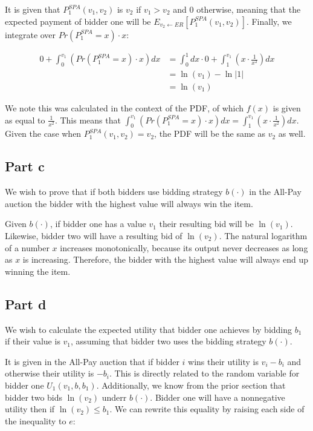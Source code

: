 \documentclass[12pt]{article}%
\begin{document}
It is given that $P_{1}^{SPA}(v_1, v_2)$ is $v_2$ if $v_1 > v_2$ and 0 otherwise, meaning that the expected payment of bidder one will be $E_{v_2 \leftarrow ER} [P_{1}^{SPA}(v_1, v_2)]$. Finally, we integrate over $Pr(P_{1}^{SPA} = x) \cdot x$:

\begin{equation}
\begin{split}
0 + \int_{0}^{v_1} (Pr(P_{1}^{SPA} = x) \cdot x)dx &= \int_{0}^{1} dx \cdot 0 + \int_{1}^{v_1} (x \cdot \frac{1}{x^2})dx\\
&= \ln(v_1) - \ln\lvert 1 \rvert\\
&= \ln(v_1)
\end{split}
\end{equation}

We note this was calculated in the context of the PDF, of which $f(x)$ is given as equal to $\frac{1}{x^2}$. This means that $\int_{0}^{v_1} (Pr(P_{1}^{SPA} = x) \cdot x)dx = \int_{1}^{v_1} (x \cdot \frac{1}{x^2})dx$. Given the case when $P_{1}^{SPA}(v_1, v_2) = v_2$, the PDF will be the same as $v_2$ as well.

\subsection*{Part c}
We wish to prove that if both bidders use bidding strategy $b(\cdot)$ in the All-Pay auction the bidder with the highest value will always win the item.

Given $b(\cdot)$, if bidder one has a value $v_1$ their resulting bid will be $\ln(v_1)$. Likewise, bidder two will have a resulting bid of $\ln(v_2)$. The natural logarithm of a number $x$ increases monotonically, because its output never decreases as long as $x$ is increasing. Therefore, the bidder with the highest value will always end up winning the item.

\subsection*{Part d}
We wish to calculate the expected utility that bidder one achieves by bidding $b_1$ if their value is $v_1$, assuming that bidder two uses the bidding strategy $b(\cdot)$.

It is given in the All-Pay auction that if bidder $i$ wins their utility is $v_i - b_i$ and otherwise their utility is $-b_i$. This is directly related to the random variable for bidder one $U_{1}(v_1, b, b_1)$. Additionally, we know from the prior section that bidder two bids $\ln(v_2)$ underr $b(\cdot)$. Bidder one will have a nonnegative utility then if $\ln(v_2) \le b_1$. We can rewrite this equality by raising each side of the inequality to $e$:
\end{document}
